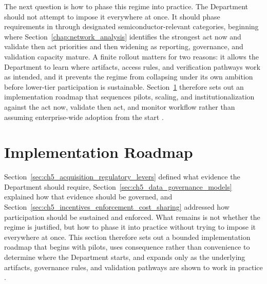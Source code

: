 The next question is how to phase this regime into practice. The Department should not attempt to impose it everywhere at once. It should phase requirements in through designated semiconductor-relevant categories, beginning where Section~\ref{chap:network_analysis} identifies the strongest act now and validate then act priorities and then widening as reporting, governance, and validation capacity mature. A finite rollout matters for two reasons: it allows the Department to learn where artifacts, access rules, and verification pathways work as intended, and it prevents the regime from collapsing under its own ambition before lower-tier participation is sustainable. Section~\ref{sec:ch5_implementation_roadmap} therefore sets out an implementation roadmap that sequences pilots, scaling, and institutionalization against the act now, validate then act, and monitor workflow rather than assuming enterprise-wide adoption from the start \parencite{ch5_ndaa2024_sec856,ch5_nist800161r1upd1,ch5_dod2022_supplychains}.

\section{Implementation Roadmap}
\label{sec:ch5_implementation_roadmap}

Section~\ref{sec:ch5_acquisition_regulatory_levers} defined what evidence the Department should require, Section~\ref{sec:ch5_data_governance_models} explained how that evidence should be governed, and Section~\ref{sec:ch5_incentives_enforcement_cost_sharing} addressed how participation should be sustained and enforced. What remains is not whether the regime is justified, but how to phase it into practice without trying to impose it everywhere at once. This section therefore sets out a bounded implementation roadmap that begins with pilots, uses consequence rather than convenience to determine where the Department starts, and expands only as the underlying artifacts, governance rules, and validation pathways are shown to work in practice \parencite{ch5_nist800161r1upd1,ch5_dbb2025_illumination}.

